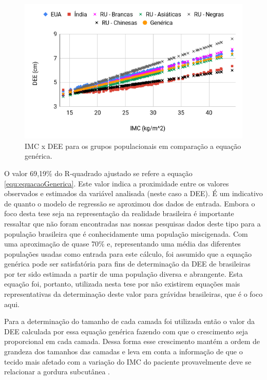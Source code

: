 \begin{figure}[ht!]
    \centering
    \includegraphics[width=0.9\linewidth]{capitulos/figuras/IMC versus DEE grupos populacionais e Equacao Generica.png} 
    \caption{\acrshort{IMC} x \acrshort{DEE} para os grupos populacionais em comparação a equação genérica.}
    \label{fig:imcDEEPopulacoesComparativoEquacaoGenerica}
\end{figure}

O valor 69,19\% do R-quadrado ajustado se refere a equação \ref{equ:equacaoGenerica}. Este valor indica a proximidade entre os valores observados e estimados da variável analisada (neste caso a \acrshort{DEE}). É um indicativo de quanto o modelo de regressão se aproximou dos dados de entrada. Embora o foco desta tese seja na representação da realidade brasileira é importante ressaltar que não foram encontradas nas nossas pesquisas dados deste tipo para a população brasileira que é conhecidamente uma população miscigenada.  Com uma aproximação de quase 70\% e, representando uma média das diferentes populações usadas como entrada para este cálculo, foi assumido que a equação genérica pode ser satisfatória para fins de determinação da \acrshort{DEE} de brasileiras por ter sido estimada a partir de uma população diversa e abrangente. Esta equação foi, portanto, utilizada nesta tese por não existirem equações mais representativas da determinação deste valor para grávidas brasileiras, que é o foco aqui.

Para a determinação do tamanho de cada camada foi utilizada então o valor da \acrshort{DEE} calculada por essa equação genérica fazendo com que o crescimento seja proporcional em cada camada. Dessa forma esse crescimento mantém a ordem de grandeza dos tamanhos das camadas e leva em conta a informação de que o tecido mais afetado com a variação do \acrshort{IMC} do paciente provavelmente deve se relacionar a gordura subcutânea \cite{Palmer1983}.

